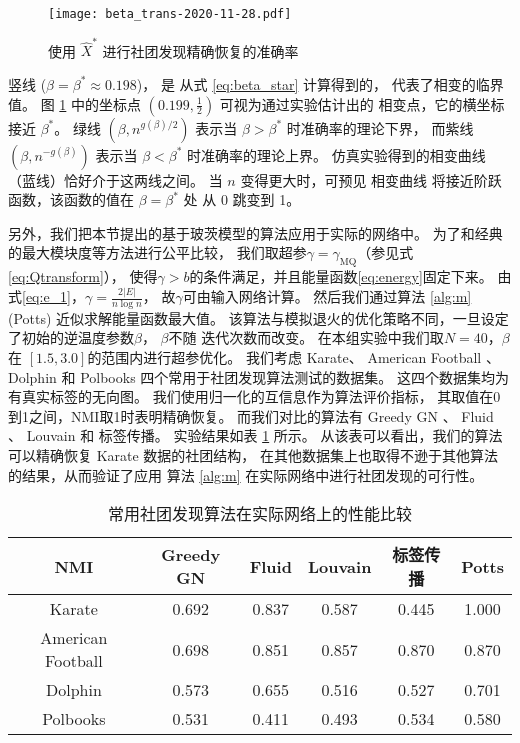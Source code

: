 \begin{figure}[ht!]
	\centering
		\texttt{[image: beta\_trans-2020-11-28.pdf]}
		\caption{使用 $\hat{X}^*$ 进行社团发现精确恢复的准确率}\label{fig:erh}
\end{figure}


竖线 ($\beta=\beta^* \approx 0.198$)，
是 从式 \eqref{eq:beta_star} 计算得到的， 
代表了相变的临界值。
图 \ref{fig:erh} 中的坐标点 $(0.199,\frac{1}{2})$
可视为通过实验估计出的
相变点，它的横坐标接近
$\beta^*$。
绿线 $(\beta, n^{g(\beta)/2})$ 
表示当 $\beta>\beta^*$ 时准确率的理论下界，
而紫线
$(\beta, n^{-g(\beta)})$ 
表示当 $\beta<\beta^*$ 时准确率的理论上界。
仿真实验得到的相变曲线（蓝线）恰好介于这两线之间。
当 $n$ 变得更大时，可预见
相变曲线 将接近阶跃函数，该函数的值在
$\beta=\beta^*$ 处
从 0 跳变到 1。

另外，我们把本节提出的基于玻茨模型的算法应用于实际的网络中。
为了和经典的最大模块度等方法进行公平比较，
我们取超参$\gamma=\gamma_{\mathrm{MQ}}$（参见式\eqref{eq:Qtransform}），
使得$\gamma>b$的条件满足，并且能量函数\eqref{eq:energy}固定下来。
由式\eqref{eq:e_1}，$\gamma = \frac{2|E|}{n \log n}$，
故$\gamma$可由输入网络计算。
然后我们通过算法 \ref{alg:m} (Potts) 近似求解能量函数最大值。
该算法与模拟退火的优化策略不同，一旦设定了初始的逆温度参数$\beta$，
$\beta$不随
迭代次数而改变。
在本组实验中我们取$N=40$，$\beta$在
$[1.5,3.0]$的范围内进行超参优化。
我们考虑 Karate\cite{zachary1977information}、
American Football \cite{girvan2002community}、
Dolphin \cite{lusseau2003emergent}
和 Polbooks \cite{newman2006modularity}
四个常用于社团发现算法测试的数据集。
这四个数据集均为有真实标签的无向图。
我们使用归一化的互信息\cite{Danon_2005}作为算法评价指标，
其取值在0到1之间，NMI取1时表明精确恢复。
而我们对比的算法有
Greedy GN \cite{clauset2004finding}、
Fluid \cite{pares2018fluid}、
Louvain \cite{blondel2008fast} 和
标签传播\cite{cordasco2010community}。
实验结果如表 \ref{tab:flatten_result} 所示。
从该表可以看出，我们的算法可以精确恢复 Karate 数据的社团结构，
在其他数据集上也取得不逊于其他算法的结果，从而验证了应用
算法 \ref{alg:m} 在实际网络中进行社团发现的可行性。

\begin{table}[!ht]
    \begin{adjustbox}{width=\columnwidth,center}
    \begin{tabular}{cccccc}
    \hline
    NMI               & Greedy GN & Fluid & Louvain  & 标签传播 & Potts\\
    \hline
    Karate            & 0.692     & 0.837 & 0.587   & 0.445         & 1.000     \\
    American Football & 0.698     & 0.851 & 0.857    & 0.870         & 0.870    \\
    Dolphin           & 0.573     & 0.655 & 0.516    & 0.527        & 0.701     \\
    Polbooks          & 0.531     & 0.411 & 0.493  & 0.534          & 0.580     \\
    \hline
    \end{tabular}
\end{adjustbox}
    \caption{常用社团发现算法在实际网络上的性能比较}\label{tab:flatten_result}
\end{table}

